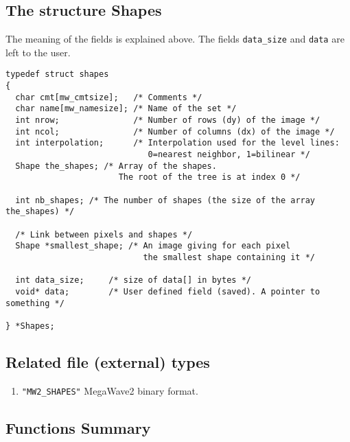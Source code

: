 \subsection{The structure Shapes}
\label{shapes_structure}

The meaning of the fields is explained above. The fields \verb+data_size+
and \verb+data+ are left to the user.
{\small
\begin{verbatim}
typedef struct shapes
{
  char cmt[mw_cmtsize];   /* Comments */
  char name[mw_namesize]; /* Name of the set */
  int nrow;               /* Number of rows (dy) of the image */
  int ncol;               /* Number of columns (dx) of the image */
  int interpolation;      /* Interpolation used for the level lines:
                             0=nearest neighbor, 1=bilinear */
  Shape the_shapes; /* Array of the shapes.
                       The root of the tree is at index 0 */
 
  int nb_shapes; /* The number of shapes (the size of the array the_shapes) */
 
  /* Link between pixels and shapes */
  Shape *smallest_shape; /* An image giving for each pixel
                            the smallest shape containing it */
 
  int data_size;     /* size of data[] in bytes */
  void* data;        /* User defined field (saved). A pointer to something */
 
} *Shapes;
\end{verbatim}
}

\subsection{Related file (external) types}
\label{shapes-file_type}

\begin{enumerate}
\item \verb+"MW2_SHAPES"+ MegaWave2 binary format.
\end{enumerate}

\subsection{Functions Summary}
\label{shapes_function}

